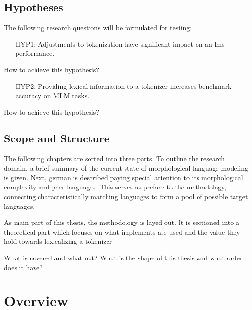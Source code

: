 \documentclass[english]{ttlab-qualify}
\begin{document}
    \section{Hypotheses}
    \label{sec:hypothesis}

    The following research questions will be formulated for testing:
    \begin{framed}
        \begin{itemize}[itemindent=1em]
            \item[HYP1:] Adjustments to tokenization have significant impact on an \ac{lm}s performance.
        \end{itemize}
    \end{framed}
    How to achieve this hypothesis?
    \begin{framed}
        \begin{itemize}[itemindent=1em]
        \item[HYP2:] Providing lexical information to a tokenizer increases benchmark accuracy on MLM tasks.
    \end{itemize}
    \end{framed}
    How to achieve this hypothesis?

    \section{Scope and Structure}
    \label{sec:scope-and-structure}

    The following chapters are sorted into three parts.
    To outline the research domain, a brief summary of the current state of morphological language modeling is given.
    Next, german is described paying special attention to its morphological complexity and peer languages.
    This serves as preface to the methodology, connecting characteristically matching languages to form a pool of possible  target languages.

    As main part of this thesis, the methodology is layed out.
    It is sectioned into a theoretical part which focuses on what implements are used and the value they hold towards lexicalizing a tokenizer

    What is covered and what not?
    What is the shape of this thesis and what order does it have?

    \chapter{Overview}
    \label{ch:overview}
\end{document}
